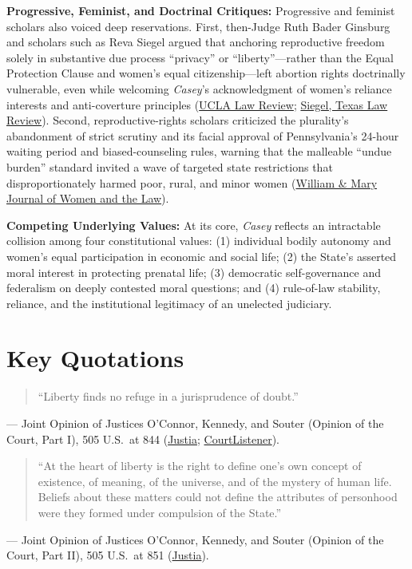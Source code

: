 \documentclass[12pt]{article}
\begin{document}
\textbf{Progressive, Feminist, and Doctrinal Critiques:} Progressive and feminist scholars also voiced deep reservations. First, then-Judge Ruth Bader Ginsburg and scholars such as Reva Siegel argued that anchoring reproductive freedom solely in substantive due process ``privacy'' or ``liberty''---rather than the Equal Protection Clause and women's equal citizenship---left abortion rights doctrinally vulnerable, even while welcoming \textit{Casey}'s acknowledgment of women's reliance interests and anti-coverture principles (\href{https://www.uclalawreview.org/the-equality-argument-for-abortion-rights/}{UCLA Law Review}; \href{https://texaslawreview.org/wp-content/uploads/2023/04/Siegel.pdf}{Siegel, Texas Law Review}). Second, reproductive-rights scholars criticized the plurality's abandonment of strict scrutiny and its facial approval of Pennsylvania's 24-hour waiting period and biased-counseling rules, warning that the malleable ``undue burden'' standard invited a wave of targeted state restrictions that disproportionately harmed poor, rural, and minor women (\href{https://scholarship.law.wm.edu/cgi/viewcontent.cgi?article=1055&context=wmjowl}{William \& Mary Journal of Women and the Law}).

\textbf{Competing Underlying Values:} At its core, \textit{Casey} reflects an intractable collision among four constitutional values: (1) individual bodily autonomy and women's equal participation in economic and social life; (2) the State's asserted moral interest in protecting prenatal life; (3) democratic self-governance and federalism on deeply contested moral questions; and (4) rule-of-law stability, reliance, and the institutional legitimacy of an unelected judiciary.

\section{Key Quotations}

\begin{quote}
``Liberty finds no refuge in a jurisprudence of doubt.''
\end{quote}
\noindent --- Joint Opinion of Justices O'Connor, Kennedy, and Souter (Opinion of the Court, Part I), 505 U.S.\ at 844 (\href{https://supreme.justia.com/cases/federal/us/505/833/}{Justia}; \href{https://www.courtlistener.com/opinion/112786/planned-parenthood-of-southeastern-pa-v-casey/}{CourtListener}).

\begin{quote}
``At the heart of liberty is the right to define one's own concept of existence, of meaning, of the universe, and of the mystery of human life. Beliefs about these matters could not define the attributes of personhood were they formed under compulsion of the State.''
\end{quote}
\noindent --- Joint Opinion of Justices O'Connor, Kennedy, and Souter (Opinion of the Court, Part II), 505 U.S.\ at 851 (\href{https://supreme.justia.com/cases/federal/us/505/833/}{Justia}).
\end{document}
